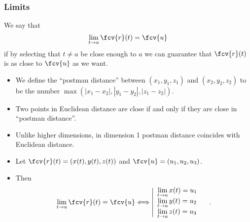 
\begin{frame}
\frametitle{Limits}
\begin{definition}
We say that $$\lim_{t\to a} \fcv{r}(t) = \fcv{u}$$ if \alert<4>{ by selecting that } $t\neq a$ be close enough to $a$ \alert<5>{we can guarantee that $\fcv{r}(t)$} \alert<3>{is as close to $\fcv{u}$ as we want}.

\medskip

\end{definition}
\end{frame}

\begin{frame}
\begin{itemize}
\item We define the ``postman distance'' between $(x_1,y_1,z_1)$ and $(x_2, y_2, z_2)$ to be the number $\max(|x_1-x_2|, |y_1-y_2|, |z_1-z_2|) $.
\item<2-> Two points in Euclidean distance are close if and only if they are close in ``postman distance''.
\item<3-> Unlike higher dimensions, in dimension 1 postman distance coincides with Euclidean distance.
\item<4-> Let $\fcv{r}(t) = ( x(t), y(t), z(t) )$ and $\fcv{u}=( u_1,u_2,u_3)$.
\item<5-> Then
\[
\lim_{t\to a} \fcv{r}(t) = \fcv{u} \Longleftrightarrow
\left|
\begin{array}{l}
\lim\limits_{t\to a} x(t) = u_1\\
\lim\limits_{t\to a} y(t) = u_2\\
\lim\limits_{t\to a} z(t) = u_3\\
\end{array}
\right.\quad .
\]
\end{itemize}
\end{frame}
